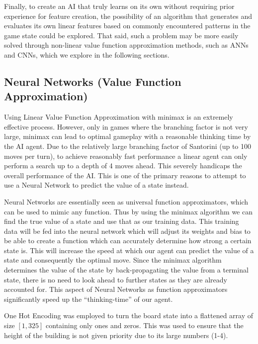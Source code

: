 \documentclass[a4paper,12pt,table]{article}
\begin{document}
Finally, to create an AI that truly learns on its own without requiring prior experience for feature creation, the possibility of an algorithm that generates and evaluates its own linear features based on commonly encountered patterns in the game state could be explored. That said, such a problem may be more easily solved through non-linear value function approximation methods, such as ANNs and CNNs, which we explore in the following sections. \par


\subsection{Neural Networks (Value Function Approximation)}

Using Linear Value Function Approximation with minimax is an extremely effective process. However, only in games where the branching factor is not very large, minimax can lead to optimal gameplay with a reasonable thinking time by the AI agent. Due to the relatively large branching factor of Santorini (up to 100 moves per turn), to achieve reasonably fast performance a linear agent can only perform a search up to a depth of 4 moves ahead. This severely handicaps the overall performance of the AI. This is one of the primary reasons to attempt to use a Neural Network to predict the value of a state instead. \par

Neural Networks are essentially seen as universal function approximators, which can be used to mimic any function. Thus by using the minimax algorithm we can find the true value of a state and use that as our training data. This training data will be fed into the neural network which will adjust its weights and bias to be able to create a function which can accurately determine how strong a certain state is. This will increase the speed at which our agent can predict the value of a state and consequently the optimal move. Since the minimax algorithm determines the value of the state by back-propagating the value from a terminal state, there is no need to look ahead to further states as they are already accounted for. This aspect of Neural Networks as function approximators significantly speed up the “thinking-time” of our agent. \par

One Hot Encoding was employed to turn the board state into a flattened array of size $[1,325]$ containing only ones and zeros. This was used to ensure that the height of the building is not given priority due to its large numbers (1-4). \par
\end{document}
